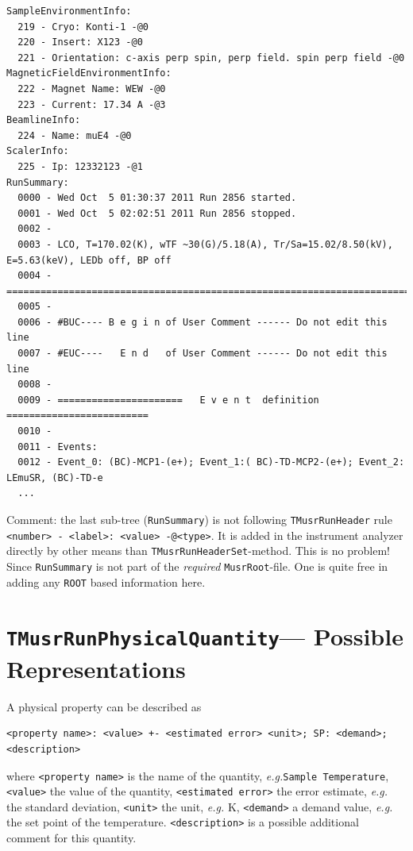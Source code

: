 \documentclass[twoside]{article}
\newcommand{\musrroot}{\texttt{MusrRoot}\xspace}
\newcommand{\rootcern}{\texttt{ROOT}\xspace}
\newcommand{\eg}{\emph{e.g.}\xspace}
\newcommand{\tmrh}{\texttt{TMusrRunHeader}\xspace}
\newcommand{\tquant}{\texttt{TMusrRunPhysicalQuantity}\xspace}
\begin{document}
\begin{small}
\begin{verbatim}
SampleEnvironmentInfo:
  219 - Cryo: Konti-1 -@0
  220 - Insert: X123 -@0
  221 - Orientation: c-axis perp spin, perp field. spin perp field -@0
MagneticFieldEnvironmentInfo:
  222 - Magnet Name: WEW -@0
  223 - Current: 17.34 A -@3
BeamlineInfo:
  224 - Name: muE4 -@0
ScalerInfo:
  225 - Ip: 12332123 -@1
RunSummary:
  0000 - Wed Oct  5 01:30:37 2011 Run 2856 started.
  0001 - Wed Oct  5 02:02:51 2011 Run 2856 stopped.
  0002 - 
  0003 - LCO, T=170.02(K), wTF ~30(G)/5.18(A), Tr/Sa=15.02/8.50(kV), E=5.63(keV), LEDb off, BP off
  0004 - =========================================================================================
  0005 - 
  0006 - #BUC---- B e g i n of User Comment ------ Do not edit this line
  0007 - #EUC----   E n d   of User Comment ------ Do not edit this line
  0008 - 
  0009 - ======================   E v e n t  definition   =========================
  0010 -
  0011 - Events: 
  0012 - Event_0: (BC)-MCP1-(e+); Event_1:( BC)-TD-MCP2-(e+); Event_2: LEmuSR, (BC)-TD-e 
  ...
\end{verbatim}
\end{small}

\noindent Comment: the last sub-tree (\texttt{RunSummary}) is not following \tmrh rule \\ \verb!<number> - <label>: <value> -@<type>!. It is added in the instrument analyzer directly by other means than \tmrh \texttt{Set}-method. This is no problem! Since \texttt{RunSummary} is not part of the \emph{required} \musrroot-file. One is quite free in adding any \rootcern based information here.

\section{\tquant --- Possible Representations} \label{sec:TMusrRunPhysicalQuantity}

A physical property can be described as
  
\begin{leftbar}
\begin{verbatim}
<property name>: <value> +- <estimated error> <unit>; SP: <demand>; <description>
\end{verbatim}
\end{leftbar}

\noindent where \texttt{<property name>} is the name of the quantity, \eg \texttt{Sample Temperature},  \texttt{<value>} the value of the quantity, \texttt{<estimated error>} the error estimate, \eg the standard deviation, \texttt{<unit>} the unit, \eg K, \texttt{<demand>} a demand value, \eg the set point of the temperature. \texttt{<description>} is a possible additional comment for this quantity.
\end{document}
